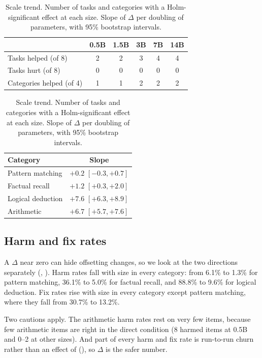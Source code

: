 \begin{table}[t]
    \centering
    \caption{Scale trend. \figleft{} Number of tasks and categories with a Holm-significant \CoT effect at each size. \figright{} Slope of $\Delta$ per doubling of parameters, with 95\% bootstrap intervals.}
    \label{tab:scale}
    \footnotesize
    \begin{tabular}{@{}lccccc@{}}
        \toprule
        & \textbf{0.5B} & \textbf{1.5B} & \textbf{3B} & \textbf{7B} & \textbf{14B} \\
        \midrule
        Tasks helped (of 8) & 2 & 2 & 3 & 4 & 4 \\
        Tasks hurt (of 8) & 0 & 0 & 0 & 0 & 0 \\
        Categories helped (of 4) & 1 & 1 & 2 & 2 & 2 \\
        \bottomrule
    \end{tabular}
    \hfill
    \begin{tabular}{@{}lc@{}}
        \toprule
        \textbf{Category} & \textbf{Slope} \\
        \midrule
        Pattern matching & $+0.2$ {\scriptsize $[-0.3, +0.7]$} \\
        Factual recall & $+1.2$ {\scriptsize $[+0.3, +2.0]$} \\
        Logical deduction & $+7.6$ {\scriptsize $[+6.3, +8.9]$} \\
        Arithmetic & $+6.7$ {\scriptsize $[+5.7, +7.6]$} \\
        \bottomrule
    \end{tabular}
\end{table}

\subsection{Harm and fix rates}
\label{sec:harmfix}

A $\Delta$ near zero can hide offsetting changes, so we look at the two directions separately (, ).
Harm rates fall with size in every category: from 6.1\% to 1.3\% for pattern matching, 36.1\% to 5.0\% for factual recall, and 88.8\% to 9.6\% for logical deduction.
Fix rates rise with size in every category except pattern matching, where they fall from 30.7\% to 13.2\%.

Two cautions apply.
The arithmetic harm rates rest on very few items, because few arithmetic items are right in the direct condition (8 harmed items at 0.5B and 0--2 at other sizes).
And part of every harm and fix rate is run-to-run churn rather than an effect of \CoT (), so $\Delta$ is the safer number.

